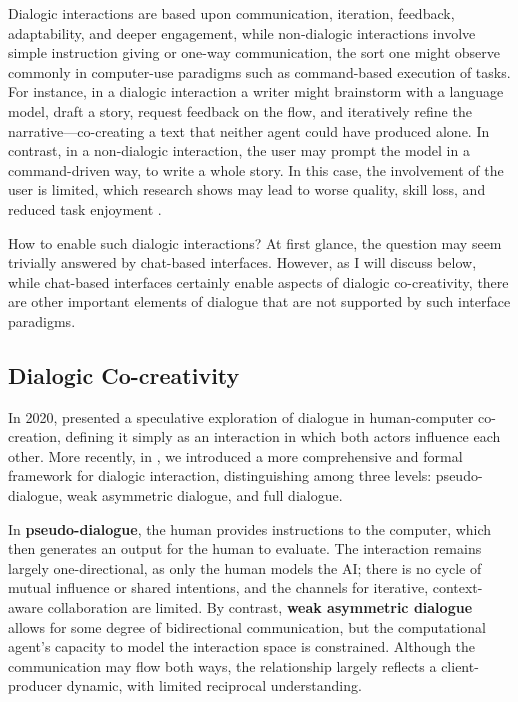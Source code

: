 Dialogic interactions are based upon communication, iteration, feedback, adaptability, and deeper engagement, while non-dialogic interactions involve simple instruction giving or one-way communication, the sort one might observe commonly in computer-use paradigms such as command-based execution of tasks. For instance, in a dialogic interaction a writer might brainstorm with a language model, draft a story, request feedback on the flow, and iteratively refine the narrative—co-creating a text that neither agent could have produced alone. In contrast, in a non-dialogic interaction, the user may prompt the model in a command-driven way, to write a whole story. In this case, the involvement of the user is limited, which research shows may lead to worse quality, skill loss, and reduced task enjoyment \cite{Abbas2024-sf, Heersmink2024-mk, DellAcqua2023-og}. 

How to enable such dialogic interactions? At first glance, the question may seem trivially answered by chat-based interfaces. However, as I will discuss below, while chat-based interfaces certainly enable aspects of dialogic co-creativity, there are other important elements of dialogue that are not supported by such interface paradigms.

\subsection{Dialogic Co-creativity}

In 2020, \cite{Bown2020-zn} presented a speculative exploration of dialogue in human-computer co-creation, defining it simply as an interaction in which both actors influence each other. More recently, in \cite{Bown2024-yx}, we introduced a more comprehensive and formal framework for dialogic interaction, distinguishing among three levels: pseudo-dialogue, weak asymmetric dialogue, and full dialogue.

In \textbf{pseudo-dialogue}, the human provides instructions to the computer, which then generates an output for the human to evaluate. The interaction remains largely one-directional, as only the human models the AI; there is no cycle of mutual influence or shared intentions, and the channels for iterative, context-aware collaboration are limited. By contrast, \textbf{weak asymmetric dialogue} allows for some degree of bidirectional communication, but the computational agent’s capacity to model the interaction space is constrained. Although the communication may flow both ways, the relationship largely reflects a client-producer dynamic, with limited reciprocal understanding.

